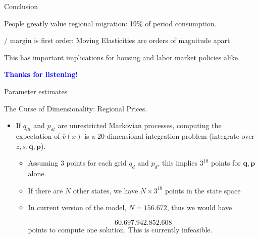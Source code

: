 \documentclass[12pt,english, aspectratio=169]{beamer}
\begin{document}
\begin{frame}{Conclusion}

\begin{widee}
\item People greatly value regional migration: 19\% of period consumption.
\item {}/ margin is first order: Moving Elasticities are orders of magnitude apart
\item This has important implications for housing and labor market policies alike.
\end{widee}

\end{frame}

\begin{frame}[plain]{}

\vspace{1cm}

\begin{center}
\textbf{\textcolor{blue}{\LARGE{}Thanks for listening!}}{\LARGE\par}
\par\end{center}

\end{frame}


\begin{frame}{Parameter estimates}

\begin{center}
\hypertarget{param-estimates}{}
\par
\par\end{center}

\end{frame}

\begin{frame}{The Curse of Dimensionality: Regional Prices.\hypertarget{CurseDimDetail}{}}

\begin{itemize}
\item If $q_{dt}$ and $p_{dt}$ are unrestricted Markovian processes, computing
the expectation of $\overline{v}(x)$ is a 20-dimensional integration
problem (integrate over $z,s,\mathbf{q},\mathbf{p}$).
\begin{itemize}
\item Assuming 3 points for each grid $q_{d}$ and $p_{d}$, this implies
$3^{18}$ points for $\mathbf{q},\mathbf{p}$ alone.
\item If there are $N$ other states, we have $N\times3^{18}$ points in
the state space
\item In current version of the model, $N=156.672$, thus we would have

\[
60.697.942.852.608
\]
points to compute one solution. This is currently infeasible.
\end{itemize}
\hyperlink{CurseDim}{}
\end{itemize}
\end{frame}
\end{document}
